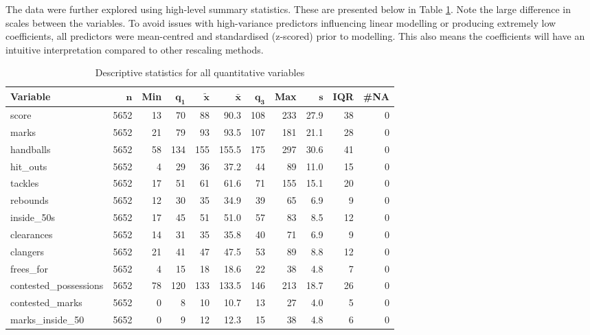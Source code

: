 \documentclass{article}
\begin{document}
The data were further explored using high-level summary statistics. These are presented below in Table \ref{tab:summarystats}. Note the large difference in scales between the variables. To avoid issues with high-variance predictors influencing linear modelling or producing extremely low coefficients, all predictors were mean-centred and standardised (z-scored) prior to modelling. This also means the coefficients will have an intuitive interpretation compared to other rescaling methods.

\begin{table}[ht]
\centering
\begingroup\footnotesize
\begin{tabular}{lrrrrrrrrrr}
 \textbf{Variable} & $\mathbf{n}$ & \textbf{Min} & $\mathbf{q_1}$ & $\mathbf{\widetilde{x}}$ & $\mathbf{\bar{x}}$ & $\mathbf{q_3}$ & \textbf{Max} & $\mathbf{s}$ & \textbf{IQR} & \textbf{\#NA} \\ 
  \hline
score & 5652 & 13 &  70 &  88 &  90.3 & 108 & 233 & 27.9 & 38 & 0 \\ 
  marks & 5652 & 21 &  79 &  93 &  93.5 & 107 & 181 & 21.1 & 28 & 0 \\ 
  handballs & 5652 & 58 & 134 & 155 & 155.5 & 175 & 297 & 30.6 & 41 & 0 \\ 
  hit\_outs & 5652 &  4 &  29 &  36 &  37.2 &  44 &  89 & 11.0 & 15 & 0 \\ 
  tackles & 5652 & 17 &  51 &  61 &  61.6 &  71 & 155 & 15.1 & 20 & 0 \\ 
  rebounds & 5652 & 12 &  30 &  35 &  34.9 &  39 &  65 &  6.9 &  9 & 0 \\ 
  inside\_50s & 5652 & 17 &  45 &  51 &  51.0 &  57 &  83 &  8.5 & 12 & 0 \\ 
  clearances & 5652 & 14 &  31 &  35 &  35.8 &  40 &  71 &  6.9 &  9 & 0 \\ 
  clangers & 5652 & 21 &  41 &  47 &  47.5 &  53 &  89 &  8.8 & 12 & 0 \\ 
  frees\_for & 5652 &  4 &  15 &  18 &  18.6 &  22 &  38 &  4.8 &  7 & 0 \\ 
  contested\_possessions & 5652 & 78 & 120 & 133 & 133.5 & 146 & 213 & 18.7 & 26 & 0 \\ 
  contested\_marks & 5652 &  0 &   8 &  10 &  10.7 &  13 &  27 &  4.0 &  5 & 0 \\ 
  marks\_inside\_50 & 5652 &  0 &   9 &  12 &  12.3 &  15 &  38 &  4.8 &  6 & 0 \\ 
  \end{tabular}
\endgroup
\caption{Descriptive statistics for all quantitative variables} 
\label{tab:summarystats}
\end{table}
\end{document}
